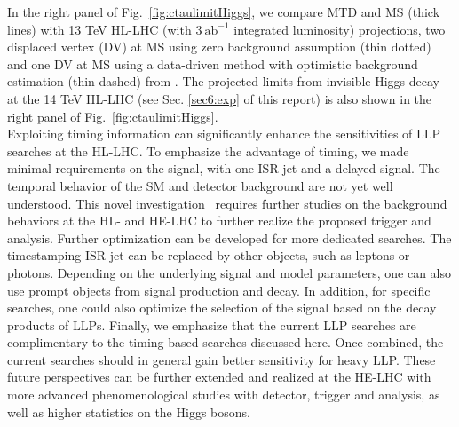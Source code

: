 In the right panel of Fig.~\ref{fig:ctaulimitHiggs}, we compare MTD and MS (thick lines) with 13 TeV  HL-LHC (with $3 ~\text{ab}^{-1}$ integrated luminosity) projections, two displaced vertex (DV) at 
MS using zero background assumption (thin dotted) and one DV at MS using a data-driven method with optimistic background estimation (thin dashed) from \cite{Coccaro:2016lnz}. 
The projected limits from invisible Higgs decay at the 14 TeV HL-LHC (see Sec. \ref{sec6:exp} of this report) is also shown in the right panel of Fig.~\ref{fig:ctaulimitHiggs}. \\

Exploiting timing information can significantly enhance 
the sensitivities of LLP searches at the HL-LHC. 
To emphasize the advantage of timing, we made minimal requirements on the signal, with one ISR jet
and a delayed signal. 
The temporal behavior of the SM and detector background are not yet well understood. This novel investigation~\cite{Liu:2018wte} requires further studies on the background behaviors at the HL- and HE-LHC to further realize the proposed trigger and analysis.
Further optimization can be developed for more dedicated searches. 
The timestamping ISR jet can be replaced by other objects, such as leptons or photons. Depending on the underlying signal 
and model parameters, one can also use prompt objects from signal production and decay. In addition, for specific searches, 
one could also optimize the selection of the signal based on the decay products of LLPs. 
Finally, we emphasize that the current LLP searches are complimentary to the timing based searches discussed here. Once combined,
the current searches should in general gain better sensitivity for heavy LLP. These future perspectives can be further extended and realized at the HE-LHC with more advanced phenomenological studies with detector, trigger and analysis, as well as higher statistics on the Higgs bosons.


